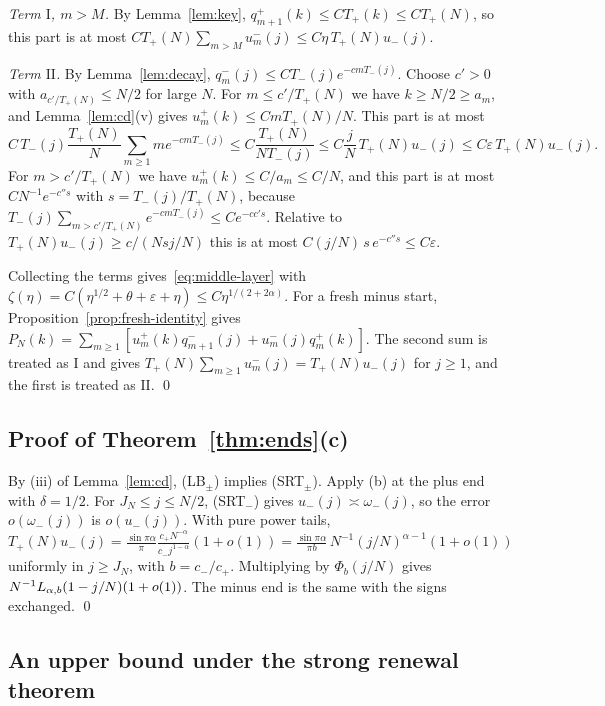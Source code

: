 \emph{Term $\mathrm I$, $m>M$.} By Lemma~\ref{lem:key}, $q^\plus_{m+1}(k)\le CT_\plus(k)\le CT_\plus(N)$,
so this part is at most $CT_\plus(N)\sum_{m>M}u^\minus_m(j)\le C\eta\,T_\plus(N)u_\minus(j)$.

\emph{Term $\mathrm{II}$.} By Lemma~\ref{lem:decay}, $q^\minus_m(j)\le CT_\minus(j)e^{-cmT_\minus(j)}$.
Choose $c'>0$ with $a_{c'/T_\plus(N)}\le N/2$ for large $N$. For $m\le c'/T_\plus(N)$ we have
$k\ge N/2\ge a_m$, and Lemma~\ref{lem:cd}(v) gives $u^\plus_m(k)\le CmT_\plus(N)/N$. This part
is at most
\[
 C\,T_\minus(j)\frac{T_\plus(N)}N\sum_{m\ge1}me^{-cmT_\minus(j)}\le C\frac{T_\plus(N)}{NT_\minus(j)}
 \le C\frac jN\,T_\plus(N)u_\minus(j)\le C\varepsilon\,T_\plus(N)u_\minus(j).
\]
For $m>c'/T_\plus(N)$ we have $u^\plus_m(k)\le C/a_m\le C/N$, and this part is at most
$CN^{-1}e^{-c''s}$ with $s=T_\minus(j)/T_\plus(N)$, because $T_\minus(j)\sum_{m>c'/T_\plus(N)}e^{-cmT_\minus(j)}\le Ce^{-cc's}$.
Relative to $T_\plus(N)u_\minus(j)\ge c/(Nsj/N)$ this is at most
$C(j/N)\,s\,e^{-c''s}\le C\varepsilon$.

Collecting the terms gives~\eqref{eq:middle-layer} with
$\zeta(\eta)=C(\eta^{1/2}+\theta+\varepsilon+\eta)\le C\eta^{1/(2+2\alpha)}$.
For a fresh minus start, Proposition~\ref{prop:fresh-identity} gives
$P_N(k)=\sum_{m\ge1}[u^\plus_m(k)q^\minus_{m+1}(j)+u^\minus_m(j)q^\plus_m(k)]$. The second sum
is treated as $\mathrm I$ and gives $T_\plus(N)\sum_{m\ge1}u^\minus_m(j)=T_\plus(N)u_\minus(j)$ for
$j\ge1$, and the first is treated as $\mathrm{II}$. \qed

\subsection{Proof of Theorem~\ref{thm:ends}(c)}

By (iii) of Lemma~\ref{lem:cd}, (LB$_\pm$) implies (SRT$_\pm$). Apply (b) at the plus end
with $\delta=1/2$. For $J_N\le j\le N/2$, (SRT$_\minus$) gives $u_\minus(j)\asymp\omega_\minus(j)$,
so the error $o(\omega_\minus(j))$ is $o(u_\minus(j))$. With pure power tails,
$T_\plus(N)u_\minus(j)=\frac{\sin\pi\alpha}\pi\frac{c_+N^{-\alpha}}{c_-j^{1-\alpha}}(1+o(1))
=\frac{\sin\pi\alpha}{\pi b}\,N^{-1}(j/N)^{\alpha-1}(1+o(1))$ uniformly in $j\ge J_N$, with
$b=c_-/c_+$. Multiplying by $\Phi_b(j/N)$ gives $N^{-1}L_{\alpha,b}(1-j/N)(1+o(1))$. The minus end is
the same with the signs exchanged. \qed

\subsection{An upper bound under the strong renewal theorem}\label{sec:lemE}


